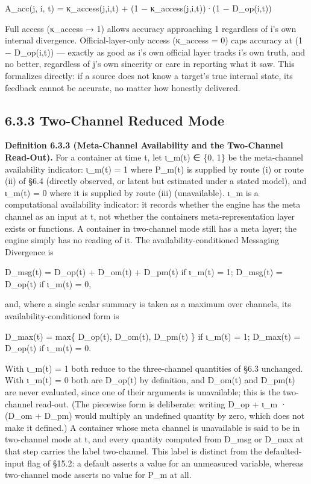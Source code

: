 \documentclass[
]{article}
\begin{document}
A\_acc(j, i, t) = κ\_access(j,i,t) + (1 − κ\_access(j,i,t))·(1 −
D\_op(i,t))

Full access (κ\_access → 1) allows accuracy approaching 1 regardless of
i's own internal divergence. Official-layer-only access (κ\_access = 0)
caps accuracy at (1 − D\_op(i,t)) --- exactly as good as i's own
official layer tracks i's own truth, and no better, regardless of j's
own sincerity or care in reporting what it saw. This formalizes
directly: if a source does not know a target's true internal state, its
feedback cannot be accurate, no matter how honestly delivered.

\hypertarget{two-channel-reduced-mode}{%
\subsection{6.3.3 Two-Channel Reduced
Mode}\label{two-channel-reduced-mode}}

\textbf{Definition 6.3.3 (Meta-Channel Availability and the Two-Channel
Read-Out).} For a container at time t, let ι\_m(t) ∈ \{0, 1\} be the
meta-channel availability indicator: ι\_m(t) = 1 where P\_m(t) is
supplied by route (i) or route (ii) of §6.4 (directly observed, or
latent but estimated under a stated model), and ι\_m(t) = 0 where it is
supplied by route (iii) (unavailable). ι\_m is a computational
availability indicator: it records whether the engine has the meta
channel as an input at t, not whether the container\textquotesingle s
meta-representation layer exists or functions. A container in
two-channel mode still has a meta layer; the engine simply has no
reading of it. The availability-conditioned Messaging Divergence is

D\_msg(t) = D\_op(t) + D\_om(t) + D\_pm(t) if ι\_m(t) = 1; D\_msg(t) =
D\_op(t) if ι\_m(t) = 0,

and, where a single scalar summary is taken as a maximum over channels,
its availability-conditioned form is

D\_max(t) = max\{ D\_op(t), D\_om(t), D\_pm(t) \} if ι\_m(t) = 1;
D\_max(t) = D\_op(t) if ι\_m(t) = 0.

With ι\_m(t) = 1 both reduce to the three-channel quantities of §6.3
unchanged. With ι\_m(t) = 0 both are D\_op(t) by definition, and
D\_om(t) and D\_pm(t) are never evaluated, since one of their arguments
is unavailable; this is the two-channel read-out. (The piecewise form is
deliberate: writing D\_op + ι\_m · (D\_om + D\_pm) would multiply an
undefined quantity by zero, which does not make it defined.) A container
whose meta channel is unavailable is said to be in two-channel mode at
t, and every quantity computed from D\_msg or D\_max at that step
carries the label two-channel. This label is distinct from the
defaulted-input flag of §15.2: a default asserts a value for an
unmeasured variable, whereas two-channel mode asserts no value for P\_m
at all.
\end{document}
